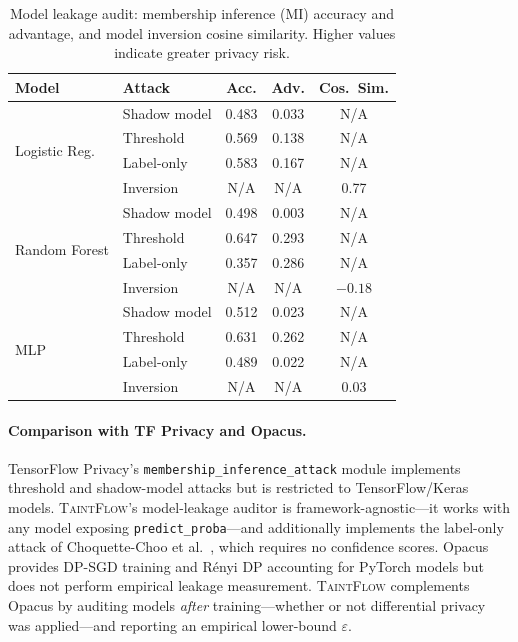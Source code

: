\documentclass[11pt]{article}
\begin{document}
\begin{table}[t]
\centering
\caption{Model leakage audit: membership inference (MI) accuracy and
  advantage, and model inversion cosine similarity.  Higher values
  indicate greater privacy risk.}\label{tab:model-leakage}
\begin{tabular}{@{}llccc@{}}
\toprule
\textbf{Model} & \textbf{Attack} & \textbf{Acc.} & \textbf{Adv.} & \textbf{Cos.\ Sim.} \\
\midrule
\multirow{4}{*}{Logistic Reg.}
  & Shadow model    & 0.483 & 0.033 & N/A \\
  & Threshold       & 0.569 & 0.138 & N/A \\
  & Label-only      & 0.583 & 0.167 & N/A \\
  & Inversion       & N/A   & N/A   & 0.77 \\
\midrule
\multirow{4}{*}{Random Forest}
  & Shadow model    & 0.498 & 0.003 & N/A \\
  & Threshold       & 0.647 & 0.293 & N/A \\
  & Label-only      & 0.357 & 0.286 & N/A \\
  & Inversion       & N/A   & N/A   & $-0.18$ \\
\midrule
\multirow{4}{*}{MLP}
  & Shadow model    & 0.512 & 0.023 & N/A \\
  & Threshold       & 0.631 & 0.262 & N/A \\
  & Label-only      & 0.489 & 0.022 & N/A \\
  & Inversion       & N/A   & N/A   & 0.03 \\
\bottomrule
\end{tabular}
\end{table}

\paragraph{Comparison with TF Privacy and Opacus.}
TensorFlow Privacy's \texttt{membership\_inference\_attack} module
implements threshold and shadow-model attacks but is restricted to
TensorFlow/Keras models.  \textsc{TaintFlow}'s model-leakage auditor
is framework-agnostic---it works with any model exposing
\texttt{predict\_proba}---and additionally implements the label-only
attack of Choquette-Choo et al.~\cite{choquette2021}, which requires
no confidence scores.  Opacus~\cite{opacus2021} provides DP-SGD
training and Rényi DP accounting for PyTorch models but does not
perform empirical leakage measurement.  \textsc{TaintFlow}
complements Opacus by auditing models \emph{after} training---whether
or not differential privacy was applied---and reporting an empirical
lower-bound $\varepsilon$.
\end{document}
